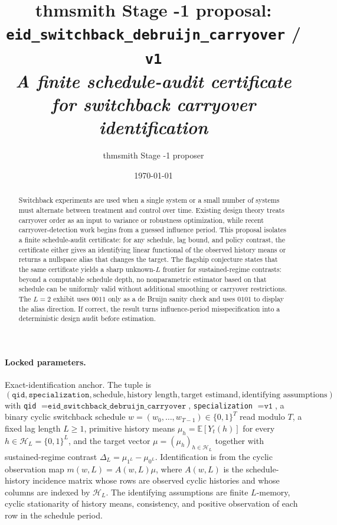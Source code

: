 \documentclass[11pt]{article}
\title{thmsmith Stage -1 proposal: \texttt{eid\_switchback\_debruijn\_carryover} / \texttt{v1}%
  \\ \large\textit{A finite schedule-audit certificate for switchback carryover identification}}
\author{thmsmith Stage -1 proposer}
\date{\today}
\newcommand{\E}{\mathbb{E}}
\newcommand{\calH}{\mathcal{H}}
\theoremstyle{definition}
\theoremstyle{plain}
\theoremstyle{remark}
\begin{document}
\maketitle


\paragraph{Locked parameters.}
Exact-identification anchor. The tuple is
\[
(\texttt{qid},\texttt{specialization},\text{schedule},\text{history length},\text{target estimand},\text{identifying assumptions})
\]
with \texttt{qid} \(=\texttt{eid\_switchback\_debruijn\_carryover}\), \texttt{specialization} \(=\texttt{v1}\), a binary cyclic switchback schedule \(w=(w_0,\ldots,w_{T-1})\in\{0,1\}^T\) read modulo \(T\), a fixed lag length \(L\geq 1\), primitive history means \(\mu_h=\E[Y_t(h)]\) for every \(h\in\calH_L=\{0,1\}^L\), and the target vector \(\mu=(\mu_h)_{h\in\calH_L}\) together with sustained-regime contrast \(\Delta_L=\mu_{1^L}-\mu_{0^L}\). Identification is from the cyclic observation map \(m(w,L)=A(w,L)\mu\), where \(A(w,L)\) is the schedule-history incidence matrix whose rows are observed cyclic histories and whose columns are indexed by \(\calH_L\). The identifying assumptions are finite \(L\)-memory, cyclic stationarity of history means, consistency, and positive observation of each row in the schedule period.

\begin{abstract}
Switchback experiments are used when a single system or a small number of systems must alternate between treatment and control over time. Existing design theory treats carryover order as an input to variance or robustness optimization, while recent carryover-detection work begins from a guessed influence period. This proposal isolates a finite schedule-audit certificate: for any schedule, lag bound, and policy contrast, the certificate either gives an identifying linear functional of the observed history means or returns a nullspace alias that changes the target. The flagship conjecture states that the same certificate yields a sharp unknown-\(L\) frontier for sustained-regime contrasts: beyond a computable schedule depth, no nonparametric estimator based on that schedule can be uniformly valid without additional smoothing or carryover restrictions. The \(L=2\) exhibit uses \(0011\) only as a de Bruijn sanity check and uses \(0101\) to display the alias direction. If correct, the result turns influence-period misspecification into a deterministic design audit before estimation.
\end{abstract}
\end{document}
